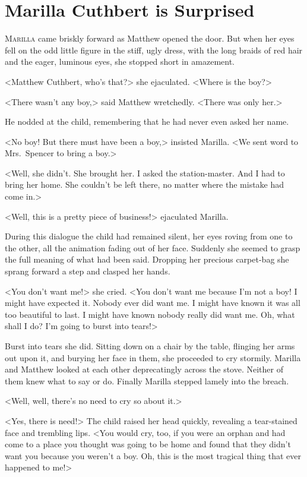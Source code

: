 \chapter{Marilla Cuthbert is Surprised}

\lettrine{M}{arilla} came briskly forward as Matthew opened the door. But when her eyes fell on the odd little figure in the stiff, ugly dress, with the long braids of red hair and the eager, luminous eyes, she stopped short in amazement.

<Matthew Cuthbert, who's that?> she ejaculated. <Where is the boy?>

<There wasn't any boy,> said Matthew wretchedly. <There was only her.>

He nodded at the child, remembering that he had never even asked her name.

<No boy! But there must have been a boy,> insisted Marilla. <We sent word to Mrs.~Spencer to bring a boy.>

<Well, she didn't. She brought her. I asked the station-master. And I had to bring her home. She couldn't be left there, no matter where the mistake had come in.>

<Well, this is a pretty piece of business!> ejaculated Marilla.

During this dialogue the child had remained silent, her eyes roving from one to the other, all the animation fading out of her face. Suddenly she seemed to grasp the full meaning of what had been said. Dropping her precious carpet-bag she sprang forward a step and clasped her hands.

<You don't want me!> she cried. <You don't want me because I'm not a boy! I might have expected it. Nobody ever did want me. I might have known it was all too beautiful to last. I might have known nobody really did want me. Oh, what shall I do? I'm going to burst into tears!>

Burst into tears she did. Sitting down on a chair by the table, flinging her arms out upon it, and burying her face in them, she proceeded to cry stormily. Marilla and Matthew looked at each other deprecatingly across the stove. Neither of them knew what to say or do. Finally Marilla stepped lamely into the breach.

<Well, well, there's no need to cry so about it.>

<Yes, there is need!> The child raised her head quickly, revealing a tear-stained face and trembling lips. <You would cry, too, if you were an orphan and had come to a place you thought was going to be home and found that they didn't want you because you weren't a boy. Oh, this is the most tragical thing that ever happened to me!>

